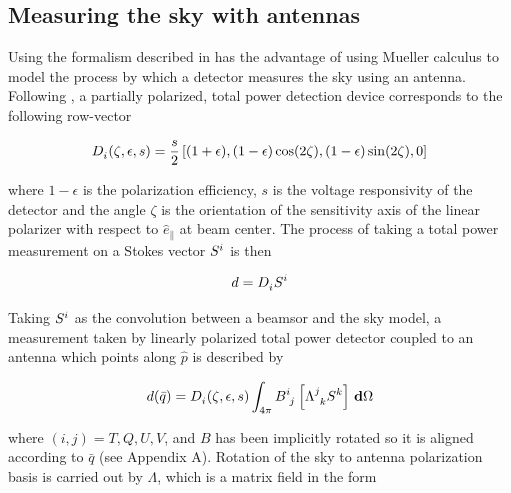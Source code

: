 \documentclass[a4paper,fleqn]{cas-dc}\sloppy
\newcommand{\co}{\mathbin{\|}}
\begin{document}
\subsection{Measuring the sky with antennas}

Using the formalism described in \cite{2007MNRAS.376.1767O} has the advantage of using Mueller calculus to model the process by which a detector measures the sky using an antenna. Following \cite{2007A&A...470..771J}, a partially polarized, total power detection device corresponds to the following row-vector 

\begin{equation}
\begin{aligned}
\tensor{D}{_{i}}(\zeta,\epsilon,s) = \frac{s}{2} \left[(1 + \epsilon), (1 - \epsilon)\cos(2\zeta), (1 - \epsilon)\sin(2\zeta), 0 \right]
\end{aligned}
\label{eq::M_pol}
\end{equation}

\noindent
where $1 - \epsilon$ is the polarization efficiency, $s$ is the voltage responsivity of the detector and the angle $\zeta$ is the orientation of the sensitivity axis of the linear polarizer with respect to $\hat{e}_{\co}$ at beam center. The process of taking a total power measurement on a Stokes vector $\tensor{S}{^{i}}$ is then

\begin{equation}
\begin{aligned}
d = \tensor{D}{_{i}} \tensor{S}{^{i}}
\end{aligned}
\label{eq::total_power_measurement}
\end{equation}

\noindent
Taking $\tensor{S}{^{i}}$ as the convolution between a beamsor and the sky model, a measurement taken by linearly polarized total power detector coupled to an antenna which points along $\hat{p}$ is described by

\begin{equation}
\begin{aligned}
d(\bar{q}) = \tensor{D}{_{i}}(\zeta,\epsilon,s) \int_{4\pi} \tensor{B}{^{i}_{j} } \left[ \tensor{\Lambda}{^{j}_{k} } \tensor{S}{^{k}} \right ] \, \mathbf{d} \Omega
\end{aligned}
\label{eq::total_power}
\end{equation}

\noindent
where $(i,j) = T,Q,U,V$, and $B$ has been implicitly rotated so it is aligned according to $\bar{q}$ (see Appendix A). Rotation of the sky to antenna polarization basis is carried out by $\Lambda$, which is a matrix field in the form
\end{document}
